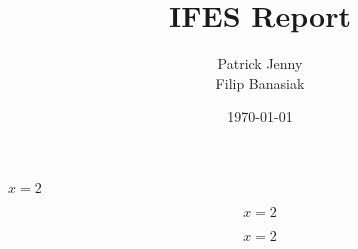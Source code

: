 \documentclass{report_class}
\title{IFES Report}
\author{Patrick Jenny\\Filip Banasiak}
\date{\today}
\begin{document}
	\maketitle
	
	
	\tableofcontents
	\newpage
	
	
	\newpage

	\clearpage
	
	
	\newpage

	
	\newpage

	
	\newpage


	$x = 2$

	$$x = 2$$
	
	\begin{equation}
		x = 2 
	\end{equation}

	\listoftables
	\listoffigures
\end{document}
